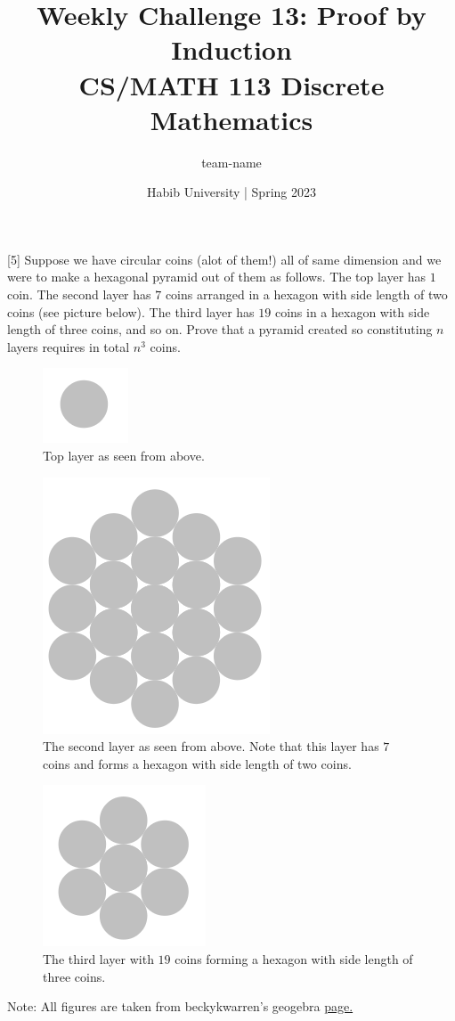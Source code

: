 \documentclass[a4paper]{exam}
\title{Weekly Challenge 13: Proof by Induction\\CS/MATH 113 Discrete Mathematics}
\author{team-name}  %
\date{Habib University | Spring 2023}
\begin{document}
\maketitle

\begin{questions}

  [5]
  Suppose we have circular coins (alot of them!) all of same dimension and we were to make a hexagonal pyramid out of them as follows. The top layer has $1$ coin. The second layer has $7$ coins arranged in a hexagon with side length of two coins (see picture below). The third layer has $19$ coins in a hexagon with side length of three coins, and so on. Prove that a pyramid created so constituting $n$ layers requires in total $n^3$ coins.
  \begin{figure}[h!]
    \centerline{\includegraphics{layer1.png}}
    \caption{Top layer as seen from above.}
    \label{layer1}
  \end{figure}
  \begin{figure}[h!]
    \centerline{\includegraphics{layer2.png}}
    \caption{The second layer as seen from above. Note that this layer has $7$ coins and forms a hexagon with side length of two coins.}
    \label{layer2}
  \end{figure}
  \newpage
  \begin{figure}[h!]
    \centerline{\includegraphics{layer3.png}}
    \caption{The third layer with $19$ coins forming a hexagon with side length of three coins.}
    \label{layer3}
  \end{figure}
  
  \begin{solution}
  \end{solution}

  Note: All figures are taken from beckykwarren's geogebra \href{https://www.geogebra.org/m/cnqdjcph}{page.}

\end{questions}
\end{document}
